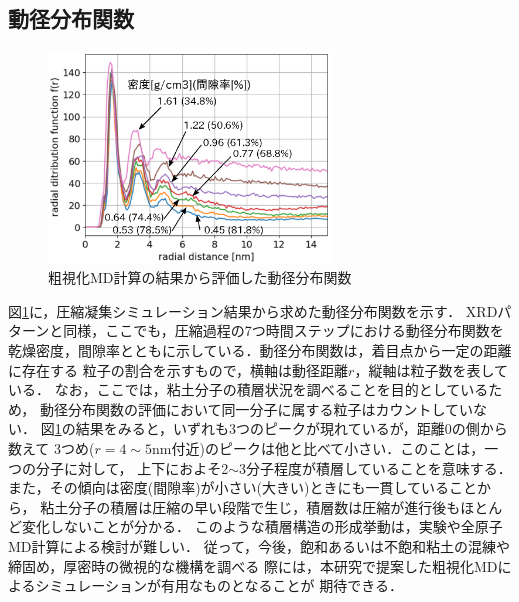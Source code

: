 ﻿\documentclass[11pt,a4j]{jarticle}
\begin{document}
\subsection{動径分布関数}
\begin{figure}
	\centering
	\includegraphics[keepaspectratio,width=75mm]{Figs/rdfs.eps}
	\vspace{-5mm}
	\caption{粗視化MD計算の結果から評価した動径分布関数}
	\label{fig:fig4}
\end{figure}
図\ref{fig:fig4}に，圧縮凝集シミュレーション結果から求めた動径分布関数を示す．
XRDパターンと同様，ここでも，圧縮過程の7つ時間ステップにおける動径分布関数を
乾燥密度，間隙率とともに示している．動径分布関数は，着目点から一定の距離に存在する
粒子の割合を示すもので，横軸は動径距離$r$，縦軸は粒子数を表している．
なお，ここでは，粘土分子の積層状況を調べることを目的としているため，
動径分布関数の評価において同一分子に属する粒子はカウントしていない．
図\ref{fig:fig4}の結果をみると，いずれも3つのピークが現れているが，距離0の側から数えて
3つめ($r=4\sim 5$nm付近)のピークは他と比べて小さい．このことは，一つの分子に対して，
上下におよそ2$\sim$3分子程度が積層していることを意味する．
また，その傾向は密度(間隙率)が小さい(大きい)ときにも一貫していることから，
粘土分子の積層は圧縮の早い段階で生じ，積層数は圧縮が進行後もほとんど変化しないことが分かる．
このような積層構造の形成挙動は，実験や全原子MD計算による検討が難しい．
従って，今後，飽和あるいは不飽和粘土の混練や締固め，厚密時の微視的な機構を調べる
際には，本研究で提案した粗視化MDによるシミュレーションが有用なものとなることが
期待できる．
\end{document}
